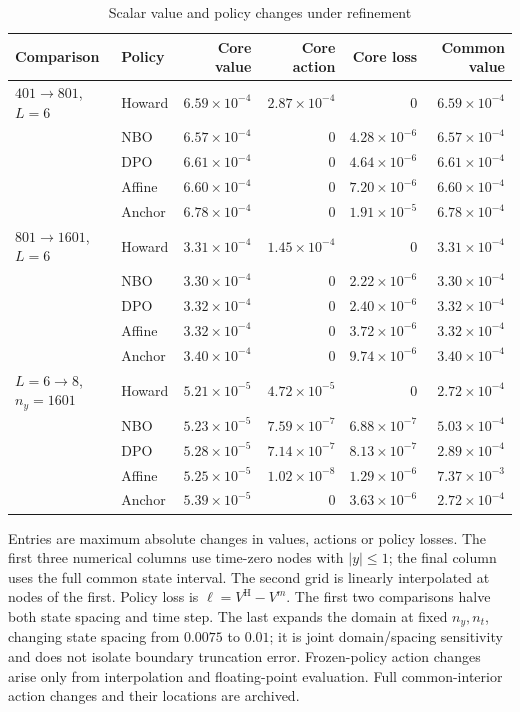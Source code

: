 \begin{table}[!htbp]
\centering\small\setlength{\tabcolsep}{3pt}
\caption{Scalar value and policy changes under refinement}
\label{tab:r14-reference-refinement}
\begin{tabular}{llrrrr}
\toprule
Comparison & Policy & Core value & Core action & Core loss & Common value \\
\midrule
$401\to801$, $L=6$ & Howard & $6.59\times10^{-4}$ & $2.87\times10^{-4}$ & 0 & $6.59\times10^{-4}$ \\
 & NBO & $6.57\times10^{-4}$ & 0 & $4.28\times10^{-6}$ & $6.57\times10^{-4}$ \\
 & DPO & $6.61\times10^{-4}$ & 0 & $4.64\times10^{-6}$ & $6.61\times10^{-4}$ \\
 & Affine & $6.60\times10^{-4}$ & 0 & $7.20\times10^{-6}$ & $6.60\times10^{-4}$ \\
 & Anchor & $6.78\times10^{-4}$ & 0 & $1.91\times10^{-5}$ & $6.78\times10^{-4}$ \\
\midrule
$801\to1601$, $L=6$ & Howard & $3.31\times10^{-4}$ & $1.45\times10^{-4}$ & 0 & $3.31\times10^{-4}$ \\
 & NBO & $3.30\times10^{-4}$ & 0 & $2.22\times10^{-6}$ & $3.30\times10^{-4}$ \\
 & DPO & $3.32\times10^{-4}$ & 0 & $2.40\times10^{-6}$ & $3.32\times10^{-4}$ \\
 & Affine & $3.32\times10^{-4}$ & 0 & $3.72\times10^{-6}$ & $3.32\times10^{-4}$ \\
 & Anchor & $3.40\times10^{-4}$ & 0 & $9.74\times10^{-6}$ & $3.40\times10^{-4}$ \\
\midrule
$L=6\to8$, $n_y=1601$ & Howard & $5.21\times10^{-5}$ & $4.72\times10^{-5}$ & 0 & $2.72\times10^{-4}$ \\
 & NBO & $5.23\times10^{-5}$ & $7.59\times10^{-7}$ & $6.88\times10^{-7}$ & $5.03\times10^{-4}$ \\
 & DPO & $5.28\times10^{-5}$ & $7.14\times10^{-7}$ & $8.13\times10^{-7}$ & $2.89\times10^{-4}$ \\
 & Affine & $5.25\times10^{-5}$ & $1.02\times10^{-8}$ & $1.29\times10^{-6}$ & $7.37\times10^{-3}$ \\
 & Anchor & $5.39\times10^{-5}$ & 0 & $3.63\times10^{-6}$ & $2.72\times10^{-4}$ \\
\bottomrule
\end{tabular}
\par\medskip
\begin{minipage}{0.97\textwidth}\footnotesize
Entries are maximum absolute changes in values, actions or policy losses. The first three numerical columns use time-zero nodes with $|y|\le1$; the final column uses the full common state interval. The second grid is linearly interpolated at nodes of the first. Policy loss is $\ell=V^{\mathrm H}-V^m$. The first two comparisons halve both state spacing and time step. The last expands the domain at fixed $n_y,n_t$, changing state spacing from $0.0075$ to $0.01$; it is joint domain/spacing sensitivity and does not isolate boundary truncation error. Frozen-policy action changes arise only from interpolation and floating-point evaluation. Full common-interior action changes and their locations are archived.
\end{minipage}
\end{table}
